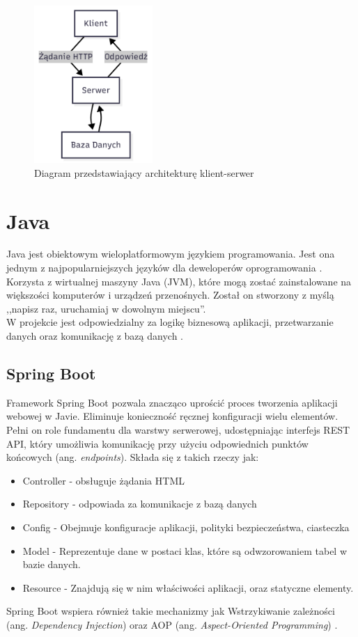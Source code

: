 \begin{figure}[H]
	\centering
	\includegraphics[width=0.4\textwidth]{images/Klient-Serwer.png}
	\caption{Diagram przedstawiający architekturę klient-serwer}
	\label{fig:KlientSerwer}
\end{figure}
\section{Java}
Java jest obiektowym wieloplatformowym językiem programowania. Jest ona jednym z najpopularniejszych języków dla deweloperów oprogramowania \cite{JavaMicrosoft}. Korzysta z wirtualnej maszyny Java (JVM), które mogą zostać zainstalowane na większości komputerów i urządzeń przenośnych. Został on stworzony z myślą ,,napisz raz, uruchamiaj w dowolnym miejscu''. 
\\W projekcie jest odpowiedzialny za logikę biznesową aplikacji, przetwarzanie danych oraz komunikację z bazą danych \cite{JDK21Docs}.
\subsection*{Spring Boot}
Framework Spring Boot pozwala znacząco uprościć proces tworzenia aplikacji webowej w Javie. Eliminuje konieczność ręcznej konfiguracji wielu elementów. Pełni on role fundamentu dla warstwy serwerowej, udostępniając interfejs REST API, który umożliwia komunikację przy użyciu odpowiednich punktów końcowych (ang. \textit{endpoints}). Składa się z takich rzeczy jak:
\begin{itemize}
	\item Controller - obsługuje żądania HTML
	\item Repository - odpowiada za komunikacje z bazą danych
	\item Config - Obejmuje konfiguracje aplikacji, polityki bezpieczeństwa, ciasteczka
	\item Model - Reprezentuje dane w postaci klas, które są odwzorowaniem tabel w bazie danych.
	\item Resource - Znajdują się w nim właściwości aplikacji, oraz statyczne elementy.
\end{itemize}
Spring Boot wspiera również takie mechanizmy jak Wstrzykiwanie zależności (ang. \textit{Dependency Injection}) oraz AOP (ang. \textit{Aspect-Oriented Programming}) \cite{SpringDocs}.
